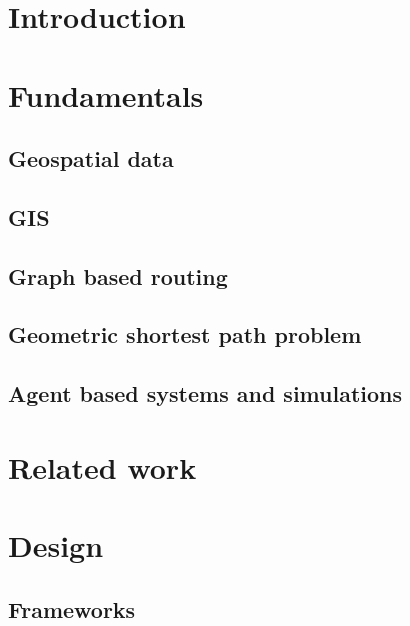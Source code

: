 \documentclass[
	12pt,
	a4paper,
	usegeometry,
	twoside,
	openright,
	toc=chapterentrywithdots
]{scrreprt}
\begin{document}
	
	

	\restoregeometry
	
	\tableofcontents
	\thispagestyle{empty}
	\newpage
	
	\chapter{Introduction}
	
	\chapter{Fundamentals}
	
		\section{Geospatial data}
		
		\section{GIS}
		
		\section{Graph based routing}
		
		\section{Geometric shortest path problem}
		
		\section{Agent based systems and simulations}
		
	\chapter{Related work}
	
	\chapter{Design}
	
		\section{Frameworks}
	
\end{document}
